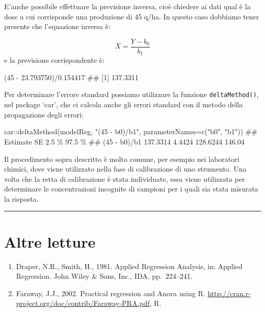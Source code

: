 \documentclass[a4paper,12pt,oneside]{book}
\providecommand{\tightlist}{%
  \setlength{\itemsep}{0pt}\setlength{\parskip}{0pt}}
\newenvironment{Shaded}{\begin{snugshade}}{\end{snugshade}}
\newcommand{\DecValTok}[1]{#1}
\newcommand{\FloatTok}[1]{#1}
\newcommand{\SpecialCharTok}[1]{#1}
\newcommand{\StringTok}[1]{#1}
\newcommand{\DocumentationTok}[1]{#1}
\newcommand{\FunctionTok}[1]{#1}
\newcommand{\AttributeTok}[1]{#1}
\newcommand{\NormalTok}[1]{#1}
\begin{document}
E'anche possibile effettuare la previsione inversa, cioè chiedere ai dati qual è la dose a cui corrisponde una produzione di 45 q/ha. In questo caso dobbiamo tener presente che l'equazione inversa è:

\[X = \frac{Y - b_0}{b_1}\]
e la previsione corrispondente è:

\begin{Shaded}
\begin{Highlighting}[]
\NormalTok{(}\DecValTok{45} \SpecialCharTok{{-}} \FloatTok{23.793750}\NormalTok{)}\SpecialCharTok{/}\FloatTok{0.154417}
\DocumentationTok{\#\# [1] 137.3311}
\end{Highlighting}
\end{Shaded}

Per determinare l'errore standard possiamo utilizzare la funzione \texttt{deltaMethod()}, nel package `car', che ci calcola anche gli errori standard con il metodo della propagazione degli errori:

\begin{Shaded}
\begin{Highlighting}[]
\NormalTok{car}\SpecialCharTok{::}\FunctionTok{deltaMethod}\NormalTok{(modelReg, }\StringTok{"(45 {-} b0)/b1"}\NormalTok{, }
                 \AttributeTok{parameterNames=}\FunctionTok{c}\NormalTok{(}\StringTok{"b0"}\NormalTok{, }\StringTok{"b1"}\NormalTok{))}
\DocumentationTok{\#\#              Estimate       SE    2.5 \% 97.5 \%}
\DocumentationTok{\#\# (45 {-} b0)/b1 137.3314   4.4424 128.6244 146.04}
\end{Highlighting}
\end{Shaded}

Il procedimento sopra descritto è molto comune, per esempio nei laboratori chimici, dove viene utilizzato nella fase di calibrazione di uno strumento. Una volta che la retta di calibrazione è stata individuate, essa viene utilizzata per determinare le concentrazioni incognite di campioni per i quali sia stata misurata la risposta.

\begin{center}\rule{0.5\linewidth}{0.5pt}\end{center}

\hypertarget{altre-letture-9}{%
\section{Altre letture}\label{altre-letture-9}}

\begin{enumerate}
\def\labelenumi{\arabic{enumi}.}
\tightlist
\item
  Draper, N.R., Smith, H., 1981. Applied Regression Analysis, in: Applied Regression. John Wiley \& Sons, Inc., IDA, pp.~224--241.
\item
  Faraway, J.J., 2002. Practical regression and Anova using R. \url{http://cran.r-project.org/doc/contrib/Faraway-PRA.pdf}, R.
\end{enumerate}
\end{document}
